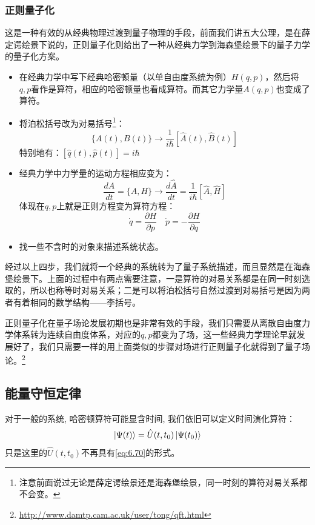 \documentclass[a4paper,zihao=-4,linespread=1]{ctexrep}
\begin{document}
	\subsubsection{正则量子化}
	这是一种有效的从经典物理过渡到量子物理的手段，前面我们讲五大公理，是在薛定谔绘景下说的，正则量子化则给出了一种从经典力学到海森堡绘景下的量子力学的量子化方案。
	\begin{itemize}
		\item [(1)]在经典力学中写下经典哈密顿量（以单自由度系统为例）$H(q,p)$，然后将$q,p$看作是算符，相应的哈密顿量也看成算符。而其它力学量$A(q,p)$也变成了算符。
		\item[(2)] 将泊松括号改为对易括号\footnote{注意前面说过无论是薛定谔绘景还是海森堡绘景，同一时刻的算符对易关系都不会变。}：$$\{A(t),B(t)\}\to\frac{1}{i\hbar}[\hat A(t),\hat B(t)]$$
		特别地有：$[\hat q(t),\hat p(t)]=i\hbar$
		\item[(3)] 经典力学中力学量的运动方程相应变为：
		\[\frac{dA}{dt}=\{A,H\}\to\frac{d\hat A}{dt}=\frac{1}{i\hbar}[\hat A,\hat H]\]
		体现在$q,p$上就是正则方程变为算符方程：
		\[\dot q=\frac{\partial H}{\partial p}\quad \dot p=-\frac{\partial H}{\partial q}\]
		\item[(4)] 找一些不含时的对象来描述系统状态。
	\end{itemize}
	
	经过以上四步，我们就将一个经典的系统转为了量子系统描述，而且显然是在海森堡绘景下。上面的过程中有两点需要注意，一是算符的对易关系都是在同一时刻选取的，所以也称等时对易关系；二是可以将泊松括号自然过渡到对易括号是因为两者有着相同的数学结构——李括号。
	
	正则量子化在量子场论发展初期也是非常有效的手段，我们只需要从离散自由度力学体系转为连续自由度体系，对应的$q,p$都变为了场，这一些经典力学理论早就发展好了，我们只需要一样的用上面类似的步骤对场进行正则量子化就得到了量子场论。\footnote{\url{http://www.damtp.cam.ac.uk/user/tong/qft.html}}
	
    \subsection{能量守恒定律}
    对于一般的系统, 哈密顿算符可能显含时间, 我们依旧可以定义时间演化算符：
    \begin{equation}
        \label{eq:6.77}
        \ket{\Psi(t)}=\hat{U}(t,t_0)\ket{\Psi(t_0)}
    \end{equation}
    只是这里的$\hat{U}(t,t_0)$不再具有\ref{eq:6.70}的形式。
\end{document}
